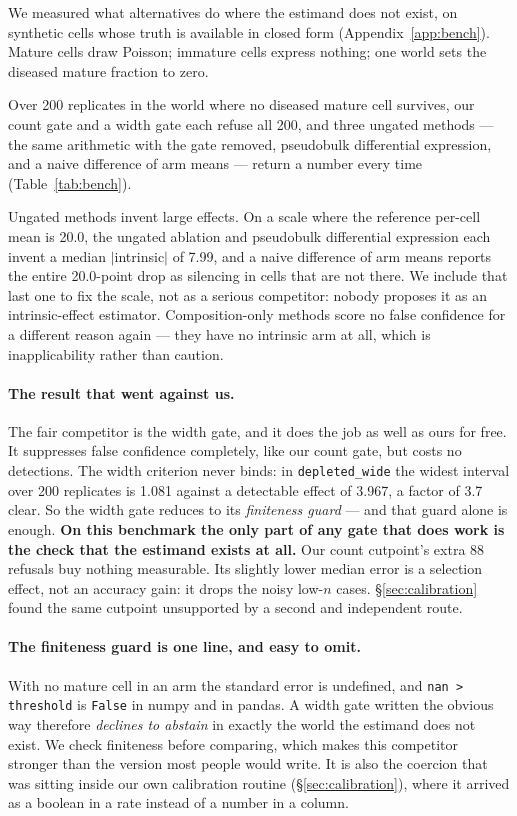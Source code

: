 We measured what alternatives do where the estimand does not exist, on synthetic
cells whose truth is available in closed form (Appendix~\ref{app:bench}). Mature
cells draw Poisson; immature cells express nothing; one world sets the diseased
mature fraction to zero.

Over 200 replicates in the world where no diseased mature cell survives, our
count gate and a width gate each refuse all 200, and three ungated methods ---
the same arithmetic with the gate removed, pseudobulk differential expression,
and a naive difference of arm means --- return a number every time
(Table~\ref{tab:bench}).

Ungated methods invent large effects. On a scale where the reference per-cell
mean is 20.0, the ungated ablation and pseudobulk differential expression each
invent a median $|$intrinsic$|$ of 7.99, and a naive difference of arm means
reports the entire 20.0-point drop as silencing in cells that are not there. We
include that last one to fix the scale, not as a serious competitor: nobody
proposes it as an intrinsic-effect estimator. Composition-only methods score no
false confidence for a different reason again --- they have no intrinsic arm at
all, which is inapplicability rather than caution.

\paragraph{The result that went against us.} The fair competitor is the width
gate, and it does the job as well as ours for free. It suppresses false
confidence completely, like our count gate, but costs no detections. The width
criterion never binds: in \texttt{depleted\_wide} the widest interval over 200
replicates is 1.081 against a detectable effect of 3.967, a factor of 3.7 clear.
So the width gate reduces to its \emph{finiteness guard} --- and that guard
alone is enough. \textbf{On this benchmark the only part of any gate that does
work is the check that the estimand exists at all.} Our count cutpoint's extra
88 refusals buy nothing measurable. Its slightly lower median error is a
selection effect, not an accuracy gain: it drops the noisy low-$n$ cases.
\S\ref{sec:calibration} found the same cutpoint unsupported by a second and
independent route.

\paragraph{The finiteness guard is one line, and easy to omit.} With no mature
cell in an arm the standard error is undefined, and \texttt{nan > threshold} is
\texttt{False} in numpy and in pandas. A width gate written the obvious way
therefore \emph{declines to abstain} in exactly the world the estimand does not
exist. We check finiteness before comparing, which makes this competitor
stronger than the version most people would write. It is also the coercion that
was sitting inside our own calibration routine (\S\ref{sec:calibration}), where
it arrived as a boolean in a rate instead of a number in a column.

